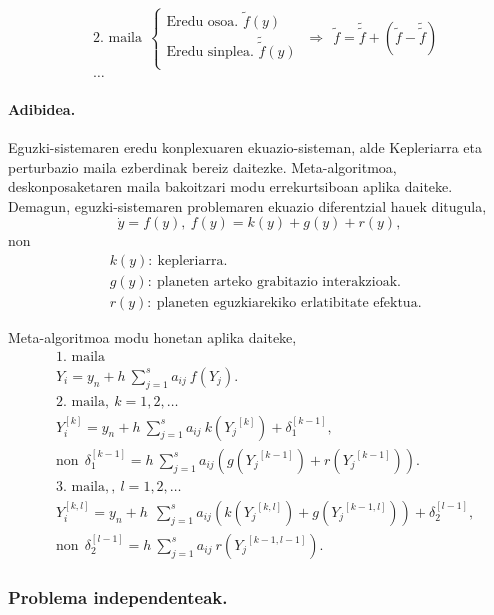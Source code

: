 \begin{align*}
&\mbox{2. maila} \ \
\left \{ \begin{array}{c}
  \mbox{Eredu osoa.   }\tilde{f}(y) \\[.25cm]
  \mbox{Eredu sinplea.    }\tilde{\tilde{f}}(y)  \\
\end{array} \right.
\ \Rightarrow \ \
\tilde{f} =\tilde{\tilde{f}}+({\tilde{f}}-\tilde{\tilde{f}})\\
&\dots  
\end{align*}

\paragraph*{Adibidea.}
Eguzki-sistemaren eredu konplexuaren ekuazio-sisteman, alde Kepleriarra eta perturbazio maila ezberdinak bereiz daitezke. Meta-algoritmoa, deskonposaketaren maila bakoitzari modu errekurtsiboan aplika daiteke. Demagun, eguzki-sistemaren problemaren ekuazio diferentzial hauek ditugula,
\begin{equation*}
\dot{y}=f(y), \ f(y)=k(y)+g(y)+r(y),
\end{equation*}
non
\begin{align*}
&k(y): \ \text{kepleriarra.}\\
&g(y): \ \text{planeten arteko grabitazio interakzioak.}\\
&r(y): \ \text{planeten eguzkiarekiko erlatibitate efektua.}
\end{align*}

Meta-algoritmoa modu honetan aplika daiteke,
\begin{align*}
&\mbox{1. maila}\\ 
&Y_i=y_n+h \ \sum^s_{j=1}{a_{ij} \ f(Y_j)}.\\
&\mbox{2. maila}, \ k=1,2,\dots\\
&Y_i^{[k]}=y_n+h\  \sum^s_{j=1}{a_{ij} \ k({Y_j}^{[k]})}+ \delta_1^{[k-1]},\\
& \text{non} \ \ \delta_1^{[k-1]}= h\  \sum^s_{j=1}{a_{ij} (g({Y_j}^{[k-1]})+r({Y_j}^{[k-1]}))}. \\
&\mbox{3. maila}, , \ l=1,2,\dots\\
&Y_i^{[k,l]}=y_n+h\ \ \sum^s_{j=1}{a_{ij} \left(k({Y_j}^{[k,l]})+g({Y_j}^{[k-1,l]})\right)}+\delta_2^{[l-1]}, \\
& \text{non} \ \ \delta_2^{[l-1]}= h \ \sum^s_{j=1}{a_{ij} \ r({Y_j}^{[k-1,l-1]})}.
\end{align*}


\subsubsection*{Problema independenteak.}

